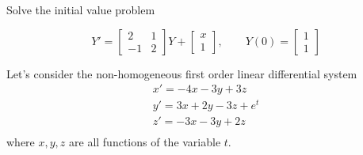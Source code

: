\documentclass[11pt]{exam}
\begin{document}
\begin{questions}

\pagebreak

\addpoints
\question[20]
Solve the initial value problem

$$
Y'=
\begin{bmatrix}
2 & 1 \\
-1 & 2 
\end{bmatrix}
Y
+
\begin{bmatrix}
x \\
1
\end{bmatrix},
\quad \quad 
Y(0)=
\begin{bmatrix}
1 \\
1
\end{bmatrix}$$

\newpage 

\addpoints
\question


Let's consider the non-homogeneous first order linear differential system
\begin{equation*}
\begin{array}{l}
       x'=-4x-3y+3z\\
       y'=3x+2y-3z+e^t\\
       z'=-3x-3y+2z\\
        \end{array}
\end{equation*}
where $x,y,z$ are all functions of the variable $t$.

\end{questions}
\end{document}

